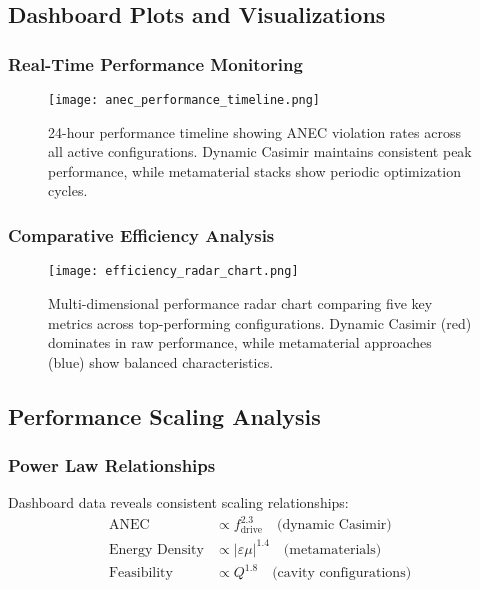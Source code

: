 \documentclass[11pt]{article}
\begin{document}
\subsection*{Dashboard Plots and Visualizations}

\subsubsection*{Real-Time Performance Monitoring}
\begin{figure}[h]
  \centering
  \texttt{[image: anec\_performance\_timeline.png]}
  \caption{24-hour performance timeline showing ANEC violation rates across all active configurations. Dynamic Casimir maintains consistent peak performance, while metamaterial stacks show periodic optimization cycles.}
  \label{fig:performance_timeline}
\end{figure}

\subsubsection*{Comparative Efficiency Analysis}
\begin{figure}[h]
  \centering
  \texttt{[image: efficiency\_radar\_chart.png]}
  \caption{Multi-dimensional performance radar chart comparing five key metrics across top-performing configurations. Dynamic Casimir (red) dominates in raw performance, while metamaterial approaches (blue) show balanced characteristics.}
  \label{fig:radar_comparison}
\end{figure}

\subsection*{Performance Scaling Analysis}

\subsubsection*{Power Law Relationships}
Dashboard data reveals consistent scaling relationships:
\begin{align}
  \text{ANEC} &\propto f_{\text{drive}}^{2.3} \quad \text{(dynamic Casimir)} \\
  \text{Energy Density} &\propto |\varepsilon\mu|^{1.4} \quad \text{(metamaterials)} \\
  \text{Feasibility} &\propto Q^{1.8} \quad \text{(cavity configurations)}
\end{align}
\end{document}
